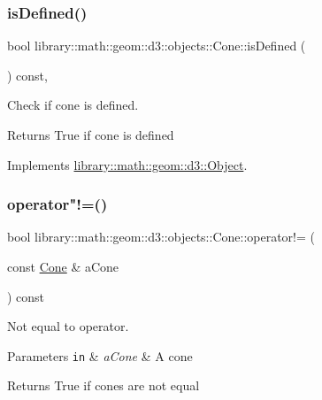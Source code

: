 \subsubsection{\texorpdfstring{is\+Defined()}{isDefined()}}
{\footnotesize\ttfamily bool library\+::math\+::geom\+::d3\+::objects\+::\+Cone\+::is\+Defined (\begin{DoxyParamCaption}{ }\end{DoxyParamCaption}) const\hspace{0.3cm}{\ttfamily [override]}, {\ttfamily [virtual]}}



Check if cone is defined. 

\begin{DoxyReturn}{Returns}
True if cone is defined 
\end{DoxyReturn}


Implements \hyperlink{classlibrary_1_1math_1_1geom_1_1d3_1_1_object_a2216442e322f0c3ca5f01a4efa22baf7}{library\+::math\+::geom\+::d3\+::\+Object}.

\mbox{\label{classlibrary_1_1math_1_1geom_1_1d3_1_1objects_1_1_cone_a046cbc1e10c11a61e02eb5b9af904eef}} 
\subsubsection{\texorpdfstring{operator"!=()}{operator!=()}}
{\footnotesize\ttfamily bool library\+::math\+::geom\+::d3\+::objects\+::\+Cone\+::operator!= (\begin{DoxyParamCaption}\item[{const \hyperlink{classlibrary_1_1math_1_1geom_1_1d3_1_1objects_1_1_cone}{Cone} \&}]{a\+Cone }\end{DoxyParamCaption}) const}



Not equal to operator. 


\begin{DoxyParams}[1]{Parameters}
\mbox{\tt in}  & {\em a\+Cone} & A cone \\
\hline
\end{DoxyParams}
\begin{DoxyReturn}{Returns}
True if cones are not equal 
\end{DoxyReturn}
\mbox{\label{classlibrary_1_1math_1_1geom_1_1d3_1_1objects_1_1_cone_a7535ef180acef7864bb3dfbb14952c7e}} 
